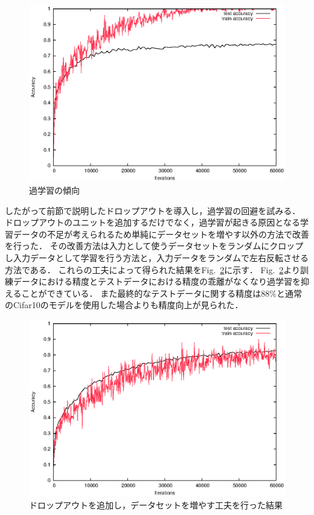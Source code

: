 \documentclass[a4paper,10pt]{jsarticle}
\begin{document}
\begin{figure}[tb]
  \begin{center}
    \includegraphics[clip,width=12cm]{./fig/eps/overtraining.eps}
  \end{center}
  \caption{過学習の傾向}
  \label{fig:過学習の傾向}
\end{figure}

したがって前節で説明したドロップアウトを導入し，過学習の回避を試みる．
ドロップアウトのユニットを追加するだけでなく，過学習が起きる原因となる学習データの不足が考えられるため単純にデータセットを増やす以外の方法で改善を行った．
その改善方法は入力として使うデータセットをランダムにクロップし入力データとして学習を行う方法と，入力データをランダムで左右反転させる方法である．
これらの工夫によって得られた結果をFig.~\ref{fig:ドロップアウトを追加し，データセットを増やす工夫を行った結果}に示す．
Fig.~\ref{fig:ドロップアウトを追加し，データセットを増やす工夫を行った結果}より訓練データにおける精度とテストデータにおける精度の乖離がなくなり過学習を抑えることができている．
また最終的なテストデータに関する精度は$88\%$と通常のCifar10のモデルを使用した場合よりも精度向上が見られた．

\begin{figure}[tb]
  \begin{center}
    \includegraphics[clip,width=12cm]{./fig/eps/dropout.eps}
  \end{center}
  \caption{ドロップアウトを追加し，データセットを増やす工夫を行った結果}
  \label{fig:ドロップアウトを追加し，データセットを増やす工夫を行った結果}
\end{figure}
\end{document}
